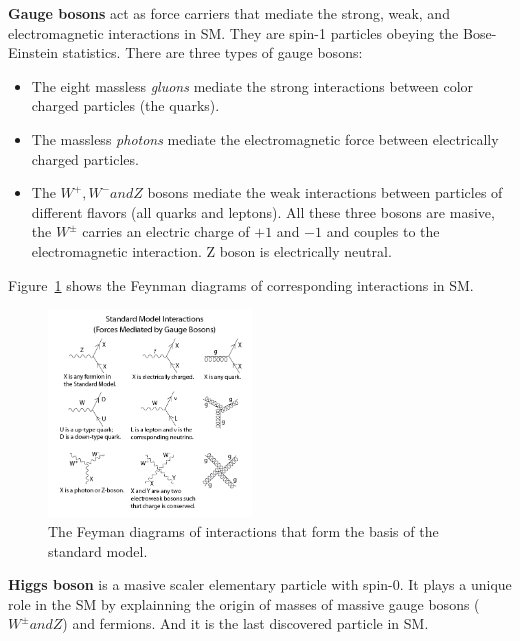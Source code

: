 \textbf{Gauge bosons}
act as force carriers that mediate the strong, weak, and electromagnetic interactions in SM.
They are spin-1 particles obeying the Bose-Einstein statistics. 
There are three types of gauge bosons:
\begin{itemize}
  \item The eight massless \textit{gluons} mediate the strong interactions between color charged particles (the quarks).
  \item The massless \textit{photons} mediate the electromagnetic force between electrically charged particles.
  \item The $W^{+}, W^{-} and Z$ bosons mediate the weak interactions between particles of different flavors (all quarks and leptons). All these three bosons are masive, the $W^{\pm}$ carries an electric charge of $+1$ and $−1$ and couples to the electromagnetic interaction. Z boson is electrically neutral.
\end{itemize}
Figure~\ref{fig:eleP-2} shows the Feynman diagrams of corresponding interactions in SM.
\begin{figure}[!htb]
  \centering
  \includegraphics[width=0.48\textwidth]{figures/Theory/Standard_Model_Feynman_Diagram_Vertices.png}
  \caption{The Feyman diagrams of interactions that form the basis of the standard model.}
  \label{fig:eleP-2}
\end{figure}

\textbf{Higgs boson}
is a masive scaler elementary particle with spin-0. 
It plays a unique role in the SM by explainning the origin of masses of massive gauge bosons ($W^{\pm} and Z$) and fermions. 
And it is the last discovered particle in SM.
